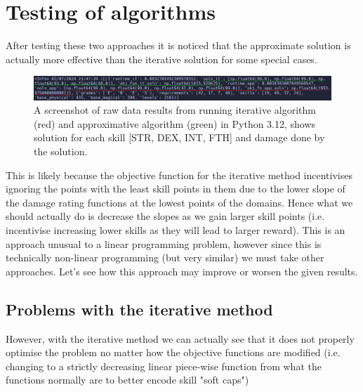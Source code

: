 \documentclass{article}
\begin{document}
\section{Testing of algorithms}
After testing these two approaches it is noticed that the approximate solution is actually more effective than the iterative solution for some special cases.
\begin{figure}[!h]
    \centering
    \includegraphics[width=\textwidth]{special_case_simplex_edited.png}
    \caption{A screenshot of raw data results from running iterative algorithm (red) and approximative algorithm (green) in Python 3.12, shows solution for each skill [STR, DEX, INT, FTH] and damage done by the solution.}
    \label{fig:screenshot-results}
\end{figure}
\par This is likely because the objective function for the iterative method incentivises ignoring the points with the least skill points in them due to the lower slope of the damage rating functions at the lowest points of the domains. Hence what we should actually do is decrease the slopes as we gain larger skill points (i.e. incentivise increasing lower skills as they will lead to larger reward). This is an approach unusual to a linear programming problem, however since this is technically non-linear programming (but very similar) we must take other approaches. Let's see how this approach may improve or worsen the given results.
\subsection{Problems with the iterative method}
However, with the iterative method we can actually see that it does not properly optimise the problem no matter how the objective functions are modified (i.e. changing to a strictly decreasing linear piece-wise function from what the functions normally are to better encode skill "soft caps")

\printbibliography[heading=bibintoc, title={Bibliography}]
\end{document}
